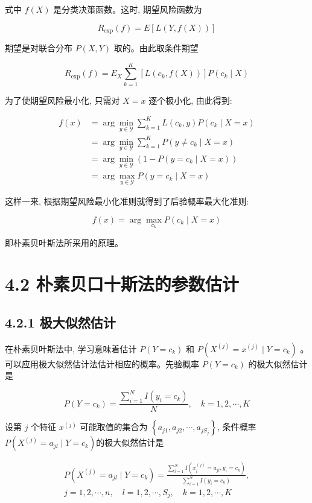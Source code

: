 \documentclass[10pt]{article}
\begin{document}
式中 $f(X)$ 是分类决策函数。这时, 期望风险函数为

$$
R_{\exp }(f)=E[L(Y, f(X))]
$$

期望是对联合分布 $P(X, Y)$ 取的。由此取条件期望

$$
R_{\exp }(f)=E_{X} \sum_{k=1}^{K}\left[L\left(c_{k}, f(X)\right)\right] P\left(c_{k} \mid X\right)
$$

为了使期望风险最小化, 只需对 $X=x$ 逐个极小化, 由此得到:

$$
\begin{aligned}
f(x) & =\arg \min _{y \in \mathcal{Y}} \sum_{k=1}^{K} L\left(c_{k}, y\right) P\left(c_{k} \mid X=x\right) \\
& =\arg \min _{y \in \mathcal{Y}} \sum_{k=1}^{K} P\left(y \neq c_{k} \mid X=x\right) \\
& =\arg \min _{y \in \mathcal{Y}}\left(1-P\left(y=c_{k} \mid X=x\right)\right) \\
& =\arg \max _{y \in \mathcal{Y}} P\left(y=c_{k} \mid X=x\right)
\end{aligned}
$$

这样一来, 根据期望风险最小化准则就得到了后验概率最大化准则:

$$
f(x)=\arg \max _{c_{k}} P\left(c_{k} \mid X=x\right)
$$

即朴素贝叶斯法所采用的原理。

\section*{4.2 朴素贝口十斯法的参数估计}
\subsection*{4.2.1 极大似然估计}
在朴素贝叶斯法中, 学习意味着估计 $P\left(Y=c_{k}\right)$ 和 $P\left(X^{(j)}=x^{(j)} \mid Y=c_{k}\right)$ 。可以应用极大似然估计法估计相应的概率。先验概率 $P\left(Y=c_{k}\right)$ 的极大似然估计是


\begin{equation*}
P\left(Y=c_{k}\right)=\frac{\sum_{i=1}^{N} I\left(y_{i}=c_{k}\right)}{N}, \quad k=1,2, \cdots, K \tag{4.8}
\end{equation*}


设第 $j$ 个特征 $x^{(j)}$ 可能取值的集合为 $\left\{a_{j 1}, a_{j 2}, \cdots, a_{j S_{j}}\right\}$, 条件概率 $P\left(X^{(j)}=a_{j l} \mid Y=c_{k}\right)$的极大似然估计是

\[
\begin{array}{r}
P\left(X^{(j)}=a_{j l} \mid Y=c_{k}\right)=\frac{\sum_{i=1}^{N} I\left(x_{i}^{(j)}=a_{j l}, y_{i}=c_{k}\right)}{\sum_{i=1}^{N} I\left(y_{i}=c_{k}\right)}, \\
j=1,2, \cdots, n, \quad l=1,2, \cdots, S_{j}, \quad k=1,2, \cdots, K \tag{4.9}
\end{array}
\]
\end{document}
